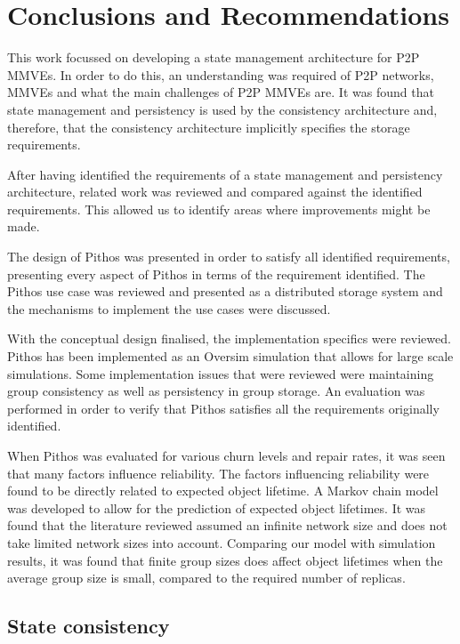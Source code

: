 \chapter{Conclusions and Recommendations}
\label{chp:CONC}

This work focussed on developing a state management architecture for P2P MMVEs. In order to do this, an understanding was required of P2P networks, MMVEs and what the main challenges of P2P MMVEs are.  It was found that state management and persistency is used by the consistency architecture and, therefore, that the consistency architecture implicitly specifies the storage requirements.

After having identified the requirements of a state management and persistency architecture, related work was reviewed and compared against the identified requirements. This allowed us to identify areas where improvements might be made.

The design of Pithos was presented in order to satisfy all identified requirements, presenting every aspect of Pithos in terms of the requirement identified. The Pithos use case was reviewed and presented as a distributed storage system and the mechanisms to implement the use cases were discussed.

With the conceptual design finalised, the implementation specifics were reviewed. Pithos has been implemented as an Oversim simulation that allows for large scale simulations. Some implementation issues that were reviewed were maintaining group consistency as well as persistency in group storage. An evaluation was performed in order to verify that Pithos satisfies all the requirements originally identified.

When Pithos was evaluated for various churn levels and repair rates, it was seen that many factors influence reliability. The factors influencing reliability were found to be directly related to expected object lifetime. A Markov chain model was developed to allow for the prediction of expected object lifetimes. It was found that the literature reviewed assumed an infinite network size and does not take limited network sizes into account. Comparing our model with simulation results, it was found that finite group sizes does affect object lifetimes when the average group size is small, compared to the required number of replicas.

\section{State consistency}


